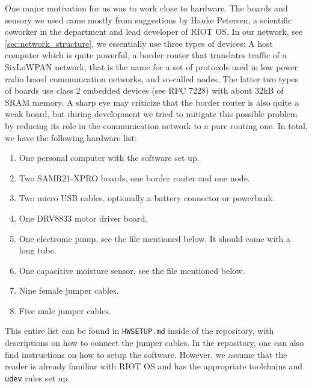 \documentclass[acmtog, language=english, nonacm]{acmart}
\begin{document}
    One major motivation for us was to work close to hardware. The boards and sensory we used came mostly from suggestions by Hauke Petersen, a scientific coworker in the department and lead developer of RIOT OS. In our network, see \cref{sec:network_structure}, we essentially use three types of devices: A host computer which is quite powerful, a border router that translates traffic of a SixLoWPAN network, that is the name for a set of protocols used in low power radio based communication networks, and so-called nodes. The latter two types of boards use class 2 embedded devices (see RFC 7228) with about 32kB of SRAM memory. A sharp eye may criticize that the border router is also quite a weak board, but during development we tried to mitigate this possible problem by reducing its role in the communication network to a pure routing one. In total, we have the following hardware list:
    \begin{enumerate}
        \item One personal computer with the software set up.
        \item Two SAMR21-XPRO boards, one border router and one node.
        \item Two micro USB cables, optionally a battery connector or powerbank.
        \item One DRV8833 motor driver board.
        \item One electronic pump, see the file mentioned below. It should come with a long tube.
        \item One capacitive moisture sensor, see the file mentioned below.
        \item Nine female jumper cables.
        \item Five male jumper cables.
    \end{enumerate}
    This entire list can be found in \texttt{HWSETUP.md} inside of the repository, with descriptions on how to connect the jumper cables. In the repository, one can also find instructions on how to setup the software. However, we assume that the reader is already familiar with RIOT OS and has the appropriate toolchains and \texttt{udev} rules set up.
\end{document}
